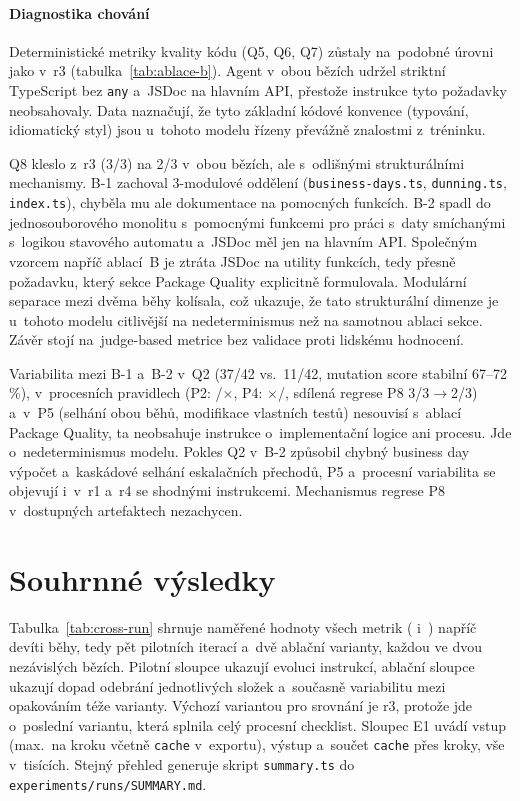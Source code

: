 \paragraph{Diagnostika chování}
Deterministické metriky kvality kódu (\acs{Q5}, \acs{Q6}, \acs{Q7})
zůstaly na~podobné úrovni jako v~r3 (tabulka~\ref{tab:ablace-b}).
Agent v~obou bězích udržel striktní TypeScript bez \texttt{any}
a~JSDoc na hlavním API, přestože instrukce tyto požadavky
neobsahovaly. Data naznačují, že tyto základní kódové konvence
(typování, idiomatický styl) jsou u~tohoto modelu řízeny převážně
znalostmi z~tréninku.

\acs{Q8} kleslo z~r3 (3/3) na 2/3 v~obou bězích, ale s~odlišnými
strukturálními mechanismy. B-1 zachoval 3-modulové oddělení
(\texttt{business-days.ts}, \texttt{dunning.ts}, \texttt{index.ts}),
chyběla mu ale dokumentace na pomocných funkcích. B-2 spadl do
jednosouborového monolitu s~pomocnými funkcemi pro práci s~daty
smíchanými s~logikou stavového automatu a~JSDoc měl jen na hlavním API. Společným vzorcem napříč
ablací~B je ztráta JSDoc na utility funkcích, tedy přesně požadavku,
který sekce Package Quality explicitně formulovala. Modulární
separace mezi dvěma běhy kolísala, což ukazuje, že tato strukturální
dimenze je u~tohoto modelu citlivější na nedeterminismus než na
samotnou ablaci sekce. Závěr stojí na~judge-based metrice bez validace
proti lidskému hodnocení.

Variabilita mezi B-1 a~B-2 v~\acs{Q2} (37/42 vs.\ 11/42, mutation
score stabilní 67--72\,\%), v~procesních pravidlech (\acs{P2}:
\checkmark/$\times$, \acs{P4}: $\times$/\checkmark, sdílená regrese
\acs{P8} 3/3$\to$2/3) a~v~\acs{P5} (selhání obou běhů, modifikace
vlastních testů) nesouvisí s~ablací Package Quality, ta neobsahuje
instrukce o~implementační logice ani procesu. Jde o~nedeterminismus
modelu. Pokles \acs{Q2} v~B-2 způsobil chybný business day výpočet
a~kaskádové selhání eskalačních přechodů, \acs{P5} a~procesní
variabilita se objevují i~v~r1 a~r4 se shodnými instrukcemi.
Mechanismus regrese \acs{P8} v~dostupných artefaktech nezachycen.


\section{Souhrnné výsledky}
\label{sec:souhrnne-vysledky}

Tabulka~\ref{tab:cross-run} shrnuje naměřené hodnoty všech metrik
( i~) napříč devíti běhy, tedy pět pilotních iterací
a~dvě ablační varianty, každou ve dvou nezávislých bězích. Pilotní sloupce ukazují evoluci instrukcí,
ablační sloupce ukazují dopad odebrání jednotlivých složek a~současně
variabilitu mezi opakováním téže varianty. Výchozí variantou pro srovnání je r3,
protože jde o~poslední variantu, která splnila celý procesní checklist.
Sloupec \acs{E1} uvádí vstup (max.\ na kroku včetně \texttt{cache} v~exportu),
výstup a~součet \texttt{cache} přes kroky, vše v~tisících. Stejný přehled
generuje skript \texttt{summary.ts} do \texttt{experiments/runs/SUMMARY.md}.

